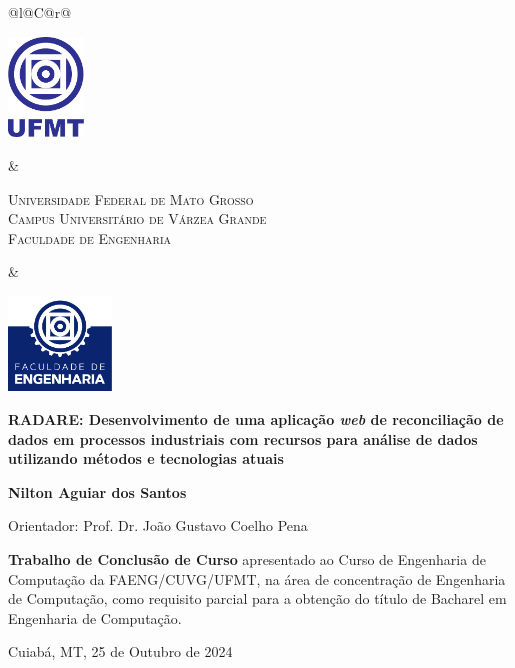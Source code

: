 \begin{titlepage}

\begin{center}

\small

\begin{tabularx}{\linewidth}{@{}l@{}C@{}r@{}}
\parbox[c]{2cm}{\includegraphics[width=2cm]{pre-textuais/figuras/ufmt}} &
\begin{center}
\textsf{\textsc{Universidade Federal de Mato Grosso\\
Campus Universitário de Várzea Grande\\
Faculdade de Engenharia}}
\end{center} &
\parbox[c]{2cm}{\includegraphics[width=2.75cm]{pre-textuais/figuras/faeng}}
\end{tabularx}

\vfill

\LARGE

\textbf{RADARE: Desenvolvimento de uma aplicação \textit{web} de reconciliação de dados em processos industriais com recursos para análise de dados utilizando métodos e tecnologias atuais}

\vfill

\Large

\textbf{Nilton Aguiar dos Santos}

\vfill

\normalsize

Orientador: Prof. Dr. João Gustavo Coelho Pena

\vfill

\hfill
\parbox{0.5\linewidth}{\textbf{Trabalho de Conclusão de Curso}
apresentado ao Curso de Engenharia de Computação da FAENG/CUVG/UFMT,
na área de concentração de Engenharia de Computação,
como requisito parcial para a obtenção do título de Bacharel
em Engenharia de Computação.}

\vfill

\large

Cuiabá, MT, 25 de Outubro de 2024

\end{center}

\end{titlepage}

